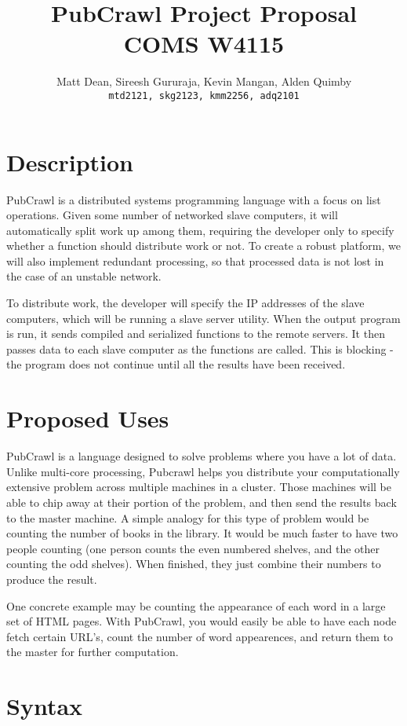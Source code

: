 \documentclass[letterpaper]{article}
\title{
  PubCrawl Project Proposal\\ \vspace{2 mm}
  \large{COMS W4115}
}
\author{
  Matt Dean, Sireesh Gururaja, Kevin Mangan, Alden Quimby\\
  \texttt{mtd2121, skg2123, kmm2256, adq2101}
}
\begin{document}
\maketitle

\section{Description}

PubCrawl is a distributed systems programming language with a focus on list operations. Given some number of networked slave computers, it will automatically split work up among them, requiring the developer only to specify whether a function should distribute work or not. To create a robust platform, we will also implement redundant processing, so that processed data is not lost in the case of an unstable network.

To distribute work, the developer will specify the IP addresses of the slave computers, which will be running a slave server utility. When the output program is run, it sends compiled and serialized functions to the remote servers. It then passes data to each slave computer as the functions are called. This is blocking - the program does not continue until all the results have been received.

\section{Proposed Uses}
PubCrawl is a language designed to solve problems where you have a lot of data. Unlike multi-core processing, Pubcrawl helps you distribute your computationally extensive problem across multiple machines in a cluster. Those machines will be able to chip away at their portion of the problem, and then send the results back to the master machine. A simple analogy for this type of problem would be counting the number of books in the library. It would be much faster to have two people counting (one person counts the even numbered shelves, and the other counting the odd shelves). When finished, they just combine their numbers to produce the result.

One concrete example may be counting the appearance of each word in a large set of HTML pages. With PubCrawl, you would easily be able to have each node fetch certain URL's, count the number of word appearences, and return them to the master for further computation. 

\section{Syntax}
\end{document}
